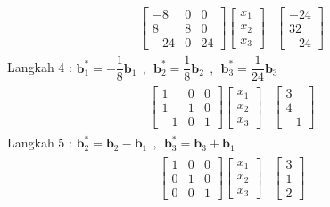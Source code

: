 \documentclass{article}   %
\begin{document}
	\begin{align*}
		\begin{array}{r|r} 
			\left[
			\begin{array}{rrr} 
				-8 & 0 & 0\\
				8 & 8 & 0\\
				-24 &0 & 24 
			\end{array} 
			\right] 
			\left[
			\begin{array}{r} 
				x_1 \\ 
				x_2 \\
				x_3
			\end{array}
			\right]  & \left[
			\begin{array}{r} 
				-24\\
				32\\
				-24 
			\end{array} 
			\right]
		\end{array}
	\end{align*}
	Langkah 4 : $\textbf{b}^*_1= -\dfrac{1}{8}\textbf{b}_1~~,~~\textbf{b}^*_2= \dfrac{1}{8}\textbf{b}_2~~,~~\textbf{b}^*_3= \dfrac{1}{24}\textbf{b}_3$ \\
	\begin{align*}
		\begin{array}{r|r} 
			\left[
			\begin{array}{rrr} 
				1 & 0 & 0\\
				1 & 1 & 0\\
				-1 &0 & 1 
			\end{array} 
			\right]\left[
			\begin{array}{r} 
				x_1 \\ 
				x_2 \\
				x_3
			\end{array}
			\right]  & \left[
			\begin{array}{r} 
				3\\
				4\\
				-1 
			\end{array} 
			\right]
		\end{array}
	\end{align*}
	Langkah 5 : $\textbf{b}^*_2= \textbf{b}_2 - \textbf{b}_1~~,~~\textbf{b}^*_3= \textbf{b}_3 + \textbf{b}_1$ \\
	\begin{align*}
		\begin{array}{r|r} 
			\left[
			\begin{array}{rrr} 
				1 & 0 & 0\\
				0 & 1 & 0\\
				0 &0 & 1 
			\end{array} 
			\right] \left[
			\begin{array}{r} 
				x_1 \\ 
				x_2 \\
				x_3
			\end{array}
			\right] & \left[
			\begin{array}{r} 
				3\\
				1\\
				2 
			\end{array} 
			\right]
		\end{array}
	\end{align*}
\end{document}
